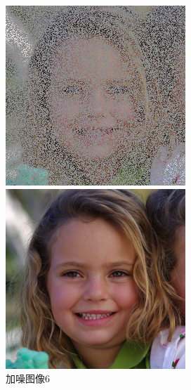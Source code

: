 \begin{figure}[H]
  \centering
  \begin{minipage}[b]{0.3\linewidth}
\includegraphics[width=\linewidth]{Picture/input/00006.png}
    \caption{加噪图像6}
    \label{noised image }
  \end{minipage}
  \hspace{0.1cm} %
   \begin{minipage}[b]{0.3\linewidth}
    \includegraphics[width=\linewidth]{Picture/label/00006.png}

\end{minipage}
\end{figure}
